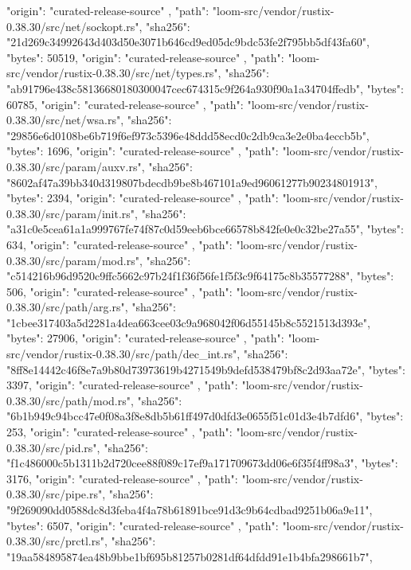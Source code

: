 {{      "origin": "curated-release-source"
    },
    {
      "path": "loom-src/vendor/rustix-0.38.30/src/net/sockopt.rs",
      "sha256": "21d269c34992643d403d50e3071b646cd9ed05dc9bdc53fe2f795bb5df43fa60",
      "bytes": 50519,
      "origin": "curated-release-source"
    },
    {
      "path": "loom-src/vendor/rustix-0.38.30/src/net/types.rs",
      "sha256": "ab91796e438c58136680180300047cec674315c9f264a930f90a1a34704ffedb",
      "bytes": 60785,
      "origin": "curated-release-source"
    },
    {
      "path": "loom-src/vendor/rustix-0.38.30/src/net/wsa.rs",
      "sha256": "29856e6d0108be6b719f6ef973c5396e48ddd58ecd0c2db9ca3e2e0ba4eccb5b",
      "bytes": 1696,
      "origin": "curated-release-source"
    },
    {
      "path": "loom-src/vendor/rustix-0.38.30/src/param/auxv.rs",
      "sha256": "8602af47a39bb340d319807bdecdb9be8b467101a9ed96061277b90234801913",
      "bytes": 2394,
      "origin": "curated-release-source"
    },
    {
      "path": "loom-src/vendor/rustix-0.38.30/src/param/init.rs",
      "sha256": "a31c0e5cea61a1a999767fe74f87c0d59eeb6bce66578b842fe0e0c32be27a55",
      "bytes": 634,
      "origin": "curated-release-source"
    },
    {
      "path": "loom-src/vendor/rustix-0.38.30/src/param/mod.rs",
      "sha256": "c514216b96d9520c9ffc5662c97b24f1f36f56fe1f5f3c9f64175c8b35577288",
      "bytes": 506,
      "origin": "curated-release-source"
    },
    {
      "path": "loom-src/vendor/rustix-0.38.30/src/path/arg.rs",
      "sha256": "1cbee317403a5d2281a4dea663cee03c9a968042f06d55145b8c5521513d393e",
      "bytes": 27906,
      "origin": "curated-release-source"
    },
    {
      "path": "loom-src/vendor/rustix-0.38.30/src/path/dec_int.rs",
      "sha256": "8ff8e14442c46f8e7a9b80d73973619b4271549b9defd538479bf8c2d93aa72e",
      "bytes": 3397,
      "origin": "curated-release-source"
    },
    {
      "path": "loom-src/vendor/rustix-0.38.30/src/path/mod.rs",
      "sha256": "6b1b949c94bcc47e0f08a3f8e8db5b61ff497d0dfd3e0655f51c01d3e4b7dfd6",
      "bytes": 253,
      "origin": "curated-release-source"
    },
    {
      "path": "loom-src/vendor/rustix-0.38.30/src/pid.rs",
      "sha256": "f1c486000c5b1311b2d720cee88f089c17ef9a171709673dd06e6f35f4ff98a3",
      "bytes": 3176,
      "origin": "curated-release-source"
    },
    {
      "path": "loom-src/vendor/rustix-0.38.30/src/pipe.rs",
      "sha256": "9f269090dd0588dc8d3feba4f4a78b61891bce91d3c9b64cdbad9251b06a9e11",
      "bytes": 6507,
      "origin": "curated-release-source"
    },
    {
      "path": "loom-src/vendor/rustix-0.38.30/src/prctl.rs",
      "sha256": "19aa584895874ea48b9bbe1bf695b81257b0281df64dfdd91e1b4bfa298661b7",
}}
